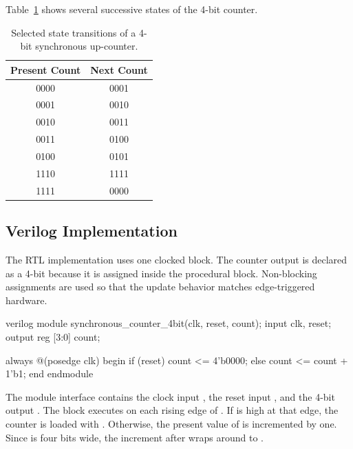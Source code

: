 \noindent Table~\ref{tab:counter_4bit_sequence_lab} shows several successive states of the 4-bit
counter.

\begin{table}[H]
\centering
\renewcommand{\arraystretch}{1.2}
\begin{tabular}{|c|c|}
\hline
\textbf{Present Count} & \textbf{Next Count} \\
\hline
0000 & 0001 \\
\hline
0001 & 0010 \\
\hline
0010 & 0011 \\
\hline
0011 & 0100 \\
\hline
0100 & 0101 \\
\hline
1110 & 1111 \\
\hline
1111 & 0000 \\
\hline
\end{tabular}
\caption{Selected state transitions of a 4-bit synchronous up-counter.}
\label{tab:counter_4bit_sequence_lab}
\end{table}

\subsection{Verilog Implementation}
The RTL implementation uses one clocked  block. The counter output is declared
as a 4-bit  because it is assigned inside the procedural block. Non-blocking
assignments are used so that the update behavior matches edge-triggered hardware.

\begin{codeblock}{verilog}
module synchronous_counter_4bit(clk, reset, count);
    input clk, reset;
    output reg [3:0] count;

    always @(posedge clk) begin
        if (reset)
            count <= 4'b0000;
        else
            count <= count + 1'b1;
    end
endmodule
\end{codeblock}

\noindent The module interface contains the clock input , the reset input
, and the 4-bit output . The  block executes
on each rising edge of . If  is high at that edge, the counter is
loaded with . Otherwise, the present value of  is incremented by
one. Since  is four bits wide, the increment after  wraps around
to .

